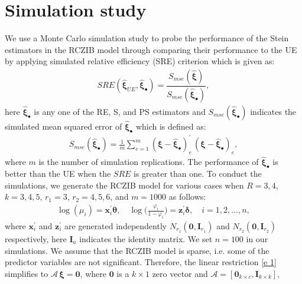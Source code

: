 \documentclass[twoside]{article}
\begin{document}
\section{Simulation study}\label{Sec 3}
We use a Monte Carlo simulation study to probe the performance of the Stein estimators in the RCZIB model through comparing their performance to the UE by applying simulated relative efficiency (SRE) criterion which is given as:
\begin{eqnarray*}
SRE ( \hat{\boldsymbol{\xi}}_{ UE } , \hat{ \boldsymbol{\xi}}_{ \bullet } )= \dfrac{ S_{mse} ( \hat{\boldsymbol{\xi}} ) }{ S_{mse} ( \hat{\boldsymbol{\xi}}_{ \bullet } ) } ,
\end{eqnarray*}
here
$ \hat{ \boldsymbol{\xi}}_{ \bullet } $
is any one of the RE, S, and PS estimators and
$ S_{mse} ( \hat{\boldsymbol{\xi}}_{ \bullet } ) $
indicates the simulated mean squared error of
$ \hat{ \boldsymbol{\xi}}_{ \bullet } $
which is defined as:
\begin{eqnarray*}
S_{mse} ( \hat{\boldsymbol{\xi}}_{ \bullet } ) =\frac{1}{m} \sum_{e = 1}^{m} ( \boldsymbol{ \xi } - \hat{ \boldsymbol{ \xi } }_{ \bullet } )_e^\prime  \, ( \boldsymbol{ \xi } - \hat{ \boldsymbol{ \xi } }_{ \bullet } )_e ,
\end{eqnarray*}
where
$ m $
is the number of simulation replications. The performance of 
$ \hat{\boldsymbol{\xi}}_{ \bullet } $
is better than the UE when the 
$ SRE $
is greater than one. To conduct the simulations, we generate the RCZIB model for various cases when
$ R = 3, 4 $,
$ k = 3, 4, 5 $,
$ r_1 = 3 $,
$ r_2 = 4, 5, 6 $,
and
$ m = 1000 $
as follows:
\begin{eqnarray*}
\log{ ( \mu_i ) } = \boldsymbol{x}^\prime_i \boldsymbol{\theta} , 
\quad
\log {  \big( \frac{ \varphi_i }{ 1 - \varphi_i  } \big ) } = \boldsymbol{z}^\prime_i \boldsymbol{\delta} ,
\quad i = 1, 2, \dots, n,
\end{eqnarray*}
where 
$ \boldsymbol{x}^\prime_i $
and
$ \boldsymbol{z}^\prime_i $
are generated independently
$ N_{r_1} ( \boldsymbol{0} , \boldsymbol{I}_{r_1} ) $
and
$ N_{r_2} ( \boldsymbol{0} , \boldsymbol{I}_{r_2} ) $
respectively, here
$ \boldsymbol{I}_a $
indicates the identity matrix. We set 
$ n = 100 $
in our simulations. We assume that the RCZIB model is sparse, i.e. some of the predictor variables are not significant. Therefore, the linear restriction \eqref{e 1} simplifies to
$ \boldsymbol{\mathcal{A}}\, \boldsymbol{\xi} = \boldsymbol{0} $, 
where 
$ \boldsymbol{0} $
is a 
$ k \times 1 $
zero vector and
$ \boldsymbol{\mathcal{A}}  = [ \boldsymbol{0}_{k \times c} , \boldsymbol{I}_{k \times k} ] $,
\end{document}
